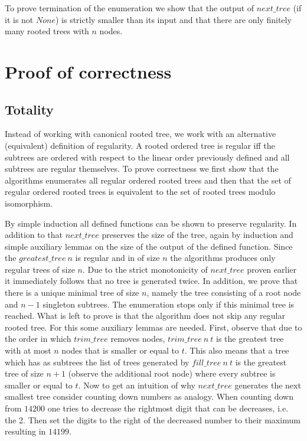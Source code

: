 To prove termination of the enumeration we show that the output of $next\_tree$ (if it is not $None$) is strictly smaller than its input and that there are only finitely many rooted trees with $n$ nodes.

\section{Proof of correctness}

\subsection{Totality}

Instead of working with canonical rooted tree, we work with an alternative (equivalent) definition of regularity.
A rooted ordered tree is regular iff the subtrees are ordered with respect to the linear order previously defined and all subtrees are regular themselves.
To prove correctness we first show that the algorithms enumerates all regular ordered rooted trees and then that the set of regular ordered rooted trees is equivalent to the set of rooted trees modulo isomorphism.

By simple induction all defined functions can be shown to preserve regularity. In addition to that $next\_tree$ preserves the size of the tree, again by induction and simple auxiliary lemmas on the size of the output of the defined function.
Since the $greatest\_tree\ n$ is regular and in of size $n$ the algorithms produces only regular trees of size $n$.
Due to the strict monotonicity of $next\_tree$ proven earlier it immediately follows that no tree is generated twice.
In addition, we prove that there is a unique minimal tree of size $n$, namely the tree consisting of a root node and $n-1$ singleton subtrees.
The enumeration stops only if this minimal tree is reached.
What is left to prove is that the algorithm does not skip any regular rooted tree.
For this some auxiliary lemmas are needed.
First, observe that due to the order in which $trim\_tree$ removes nodes, $trim\_tree\ n\ t$ is the greatest tree with at most $n$ nodes that is smaller or equal to $t$.
This also means that a tree which has as subtrees the list of trees generated by $fill\_tree\ n\ t$ is the greatest tree of size $n + 1$ (observe the additional root node) where every subtree is smaller or equal to $t$.
Now to get an intuition of why $next\_tree$ generates the next smallest tree consider counting down numbers as analogy.
When counting down from $14200$ one tries to decrease the rightmost digit that can be decreases, i.e. the 2.
Then set the digits to the right of the decreased number to their maximum resulting in $14199$.

